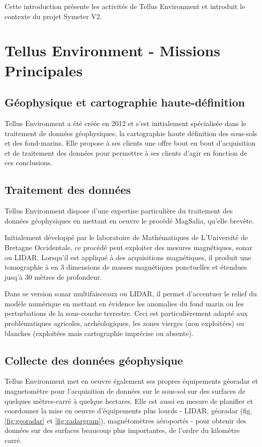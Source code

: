 \documentclass[12pt,a4paper]{report}
\begin{document}
\para Cette introduction présente les activités de Tellus Environment et introduit le contexte du projet Symeter V2.

	\section{Tellus Environment - Missions Principales}

	\subsection{Géophysique et cartographie haute-définition}
	Tellus Environment a été créée en 2012 et s'est initialement spécialisée dans le traitement de données géophysiques, la cartographie haute définition des sous-sols et des fond-marins. Elle propose à ses clients une offre bout en bout d'acquisition et de traitement des données pour permettre à ses clients d'agir en fonction de ces conclusions.
	
	\subsection{Traitement des données}
	Tellus Environment dispose d'une expertise particulière du traitement des données géophysiques en mettant en oeuvre le procédé MagSalia, qu'elle brevète.
	
	\para Initialement développé par le laboratoire de Mathématiques de L'Université de Bretagne Occidentale, ce procédé peut exploiter des mesures magnétiques, sonar ou LIDAR. Lorsqu'il est appliqué à des acquisitions magnétiques, il produit une tomographie à en 3 dimensions de masses magnétiques ponctuelles et étendues jusq'à 30 mètres de profondeur.
	
	\para Dans se version sonar multifaisceaux ou LIDAR, il permet d'accentuer le relief du modèle numérique en mettant en évidence les anomalies du fond marin ou les perturbations de la sous-couche terrestre. Ceci est particulièrement adapté aux problématiques agricoles, archéologiques, les zones vierges (non exploitées) ou blanches (exploitées mais cartographie imprécise ou absente).
	
	\subsection{Collecte des données géophysique}
	
	\para Tellus Environment met en oeuvre également ses propres équipements géoradar et magnetomètre pour l'acquisition de données sur le sous-sol sur des surfaces de quelques mètres-carré à quelque hectares. Elle est aussi en mesure de planifier et coordonner la mise en oeuvre d'équipements plus lourds - LIDAR, géoradar (fig. \ref{fig:georadar} et \ref{fig:radargram}), magnétomètres aéroportés - pour obtenir des données sur des surfaces beaucoup plus importantes, de l'ordre du kilomètre carré.
	
\end{document}
